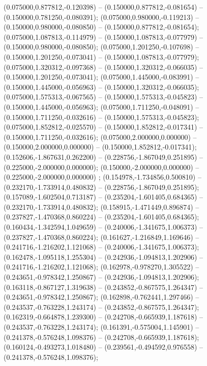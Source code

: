  (0.075000,0.877812,-0.120398) -- (0.150000,0.877812,-0.081654) -- (0.150000,0.781250,-0.080391);
 (0.075000,0.980000,-0.119213) -- (0.150000,0.980000,-0.080850) -- (0.150000,0.877812,-0.081654);
 (0.075000,1.087813,-0.114979) -- (0.150000,1.087813,-0.077979) -- (0.150000,0.980000,-0.080850);
 (0.075000,1.201250,-0.107698) -- (0.150000,1.201250,-0.073041) -- (0.150000,1.087813,-0.077979);
 (0.075000,1.320312,-0.097368) -- (0.150000,1.320312,-0.066035) -- (0.150000,1.201250,-0.073041);
 (0.075000,1.445000,-0.083991) -- (0.150000,1.445000,-0.056963) -- (0.150000,1.320312,-0.066035);
 (0.075000,1.575313,-0.067565) -- (0.150000,1.575313,-0.045823) -- (0.150000,1.445000,-0.056963);
 (0.075000,1.711250,-0.048091) -- (0.150000,1.711250,-0.032616) -- (0.150000,1.575313,-0.045823);
 (0.075000,1.852812,-0.025570) -- (0.150000,1.852812,-0.017341) -- (0.150000,1.711250,-0.032616);
 (0.075000,2.000000,0.000000) -- (0.150000,2.000000,0.000000) -- (0.150000,1.852812,-0.017341);
 (0.152606,-1.867631,0.262200) -- (0.228756,-1.867049,0.251895) -- (0.225000,-2.000000,0.000000);
 (0.150000,-2.000000,0.000000) -- (0.225000,-2.000000,0.000000) ;
 (0.154978,-1.734856,0.500810) -- (0.232170,-1.733914,0.480832) -- (0.228756,-1.867049,0.251895);
 (0.157089,-1.602504,0.713187) -- (0.235204,-1.601405,0.684365) -- (0.232170,-1.733914,0.480832);
 (0.158915,-1.471449,0.896874) -- (0.237827,-1.470368,0.860224) -- (0.235204,-1.601405,0.684365);
 (0.160434,-1.342594,1.049659) -- (0.240006,-1.341675,1.006373) -- (0.237827,-1.470368,0.860224);
 (0.161627,-1.216849,1.169646) -- (0.241716,-1.216202,1.121068) -- (0.240006,-1.341675,1.006373);
 (0.162478,-1.095118,1.255304) -- (0.242936,-1.094813,1.202906) -- (0.241716,-1.216202,1.121068);
 (0.162978,-0.978270,1.305522) -- (0.243651,-0.978342,1.250867) -- (0.242936,-1.094813,1.202906);
 (0.163118,-0.867127,1.319638) -- (0.243852,-0.867575,1.264347) -- (0.243651,-0.978342,1.250867);
 (0.162898,-0.762441,1.297466) -- (0.243537,-0.763228,1.243174) -- (0.243852,-0.867575,1.264347);
 (0.162319,-0.664878,1.239300) -- (0.242708,-0.665939,1.187618) -- (0.243537,-0.763228,1.243174);
 (0.161391,-0.575004,1.145901) -- (0.241378,-0.576248,1.098376) -- (0.242708,-0.665939,1.187618);
 (0.160124,-0.493273,1.018480) -- (0.239561,-0.494592,0.976558) -- (0.241378,-0.576248,1.098376);
